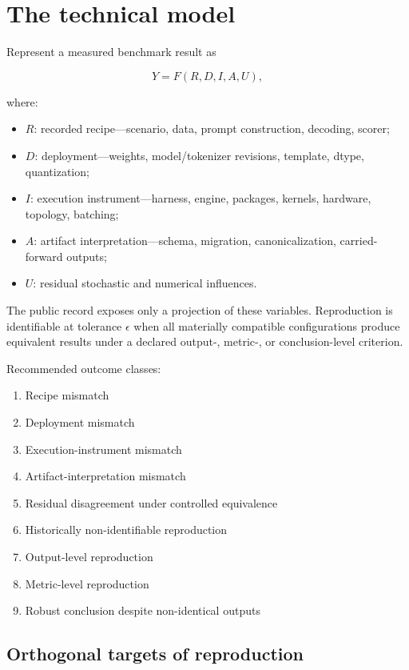 \documentclass[11pt]{article}
\begin{document}
\section{The technical model}

Represent a measured benchmark result as

\[
Y = F(R,D,I,A,U),
\]

where:

\begin{itemize}
  \item $R$: recorded recipe---scenario, data, prompt construction, decoding, scorer;
  \item $D$: deployment---weights, model/tokenizer revisions, template, dtype, quantization;
  \item $I$: execution instrument---harness, engine, packages, kernels, hardware, topology, batching;
  \item $A$: artifact interpretation---schema, migration, canonicalization, carried-forward outputs;
  \item $U$: residual stochastic and numerical influences.
\end{itemize}

The public record exposes only a projection of these variables. Reproduction is identifiable at tolerance $\epsilon$ when all materially compatible configurations produce equivalent results under a declared output-, metric-, or conclusion-level criterion.

Recommended outcome classes:

\begin{enumerate}
  \item Recipe mismatch
  \item Deployment mismatch
  \item Execution-instrument mismatch
  \item Artifact-interpretation mismatch
  \item Residual disagreement under controlled equivalence
  \item Historically non-identifiable reproduction
  \item Output-level reproduction
  \item Metric-level reproduction
  \item Robust conclusion despite non-identical outputs
\end{enumerate}

\subsection{Orthogonal targets of reproduction}
\end{document}
